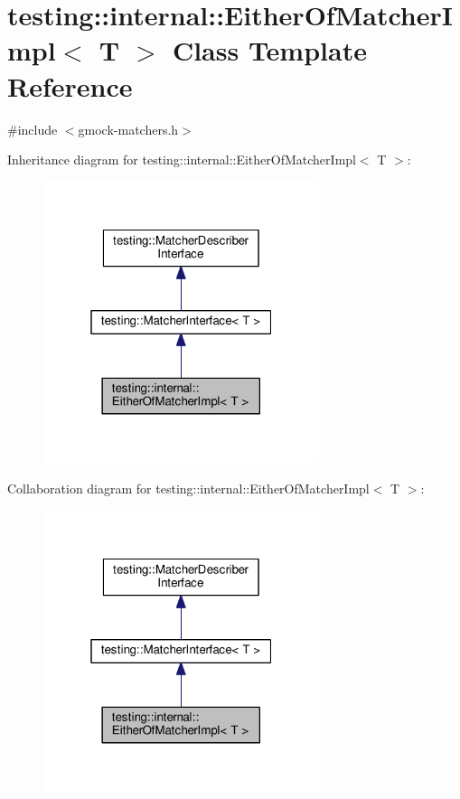 \hypertarget{classtesting_1_1internal_1_1EitherOfMatcherImpl}{}\section{testing\+:\+:internal\+:\+:Either\+Of\+Matcher\+Impl$<$ T $>$ Class Template Reference}
\label{classtesting_1_1internal_1_1EitherOfMatcherImpl}


{\ttfamily \#include $<$gmock-\/matchers.\+h$>$}



Inheritance diagram for testing\+:\+:internal\+:\+:Either\+Of\+Matcher\+Impl$<$ T $>$\+:
\nopagebreak
\begin{figure}[H]
\begin{center}
\leavevmode
\includegraphics[width=229pt]{classtesting_1_1internal_1_1EitherOfMatcherImpl__inherit__graph}
\end{center}
\end{figure}


Collaboration diagram for testing\+:\+:internal\+:\+:Either\+Of\+Matcher\+Impl$<$ T $>$\+:
\nopagebreak
\begin{figure}[H]
\begin{center}
\leavevmode
\includegraphics[width=229pt]{classtesting_1_1internal_1_1EitherOfMatcherImpl__coll__graph}
\end{center}
\end{figure}
